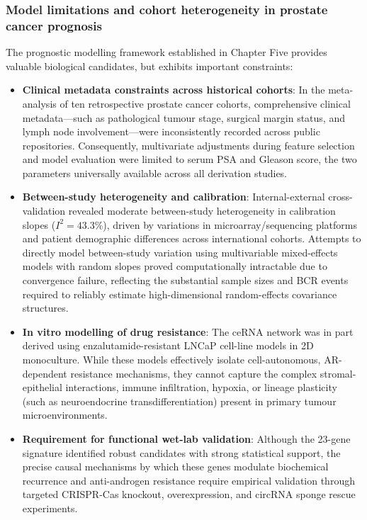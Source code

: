 \subsubsection{Model limitations and cohort heterogeneity in prostate cancer prognosis}
The prognostic modelling framework established in Chapter Five provides valuable biological candidates, but exhibits important constraints:

\begin{itemize}
    \item \textbf{Clinical metadata constraints across historical cohorts}: In the meta-analysis of ten retrospective prostate cancer cohorts, comprehensive clinical metadata—such as pathological tumour stage, surgical margin status, and lymph node involvement—were inconsistently recorded across public repositories. Consequently, multivariate adjustments during feature selection and model evaluation were limited to serum PSA and Gleason score, the two parameters universally available across all derivation studies.
    
    \item \textbf{Between-study heterogeneity and calibration}: Internal-external cross-validation revealed moderate between-study heterogeneity in calibration slopes ($I^2 = 43.3\%$), driven by variations in microarray/sequencing platforms and patient demographic differences across international cohorts. Attempts to directly model between-study variation using multivariable mixed-effects models with random slopes proved computationally intractable due to convergence failure, reflecting the substantial sample sizes and BCR events required to reliably estimate high-dimensional random-effects covariance structures. 

    \item \textbf{In vitro modelling of drug resistance}: The ceRNA network was in part derived using enzalutamide-resistant LNCaP cell-line models in 2D monoculture. While these models effectively isolate cell-autonomous, AR-dependent resistance mechanisms, they cannot capture the complex stromal-epithelial interactions, immune infiltration, hypoxia, or lineage plasticity (such as neuroendocrine transdifferentiation) present in primary tumour microenvironments.

    \item \textbf{Requirement for functional wet-lab validation}: Although the 23-gene signature identified robust candidates with strong statistical support, the precise causal mechanisms by which these genes modulate biochemical recurrence and anti-androgen resistance require empirical validation through targeted CRISPR-Cas knockout, overexpression, and circRNA sponge rescue experiments.
\end{itemize}

